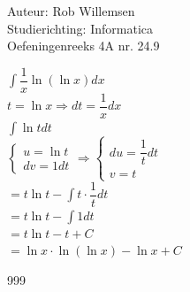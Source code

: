 \documentclass[a4paper]{article}
\newcommand{\dint}{\displaystyle\int}
\begin{document}
\noindent \large Auteur: Rob Willemsen \\
\noindent \large Studierichting: Informatica \\
\noindent \large Oefeningenreeks 4A nr. 24.9 \\

\medskip

\normalsize

$\dint \dfrac{1}{x} \ln(\ln x) dx$ \\

$t = \ln x \Rightarrow dt = \dfrac{1}{x} dx$ \\

$\dint \ln t dt$ \\

$ \left\{
\begin{array}{l}
u = \ln t \\
dv = 1dt
\end{array} \right.
\Rightarrow
\left\{
\begin{array}{l}
du = \dfrac{1}{t} dt \\
v = t
\end{array} 
\right.$ \\

$= t \ln t - \dint t \cdot \dfrac{1}{t} dt$ \\

$= t \ln t - \dint 1 dt$ \\

$= t \ln t - t + C$ \\

$= \ln x \cdot \ln(\ln x) - \ln x + C$ \\

\begin{thebibliography}{999}
\end{thebibliography}
\end{document}
